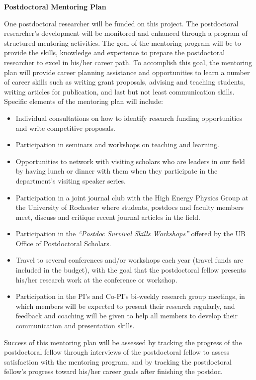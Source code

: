 \documentclass[11pt]{article}
\begin{document}

\noindent
{\Large \bf Postdoctoral Mentoring Plan}
\bigskip

One postdoctoral researcher will be funded on this project. The
postdoctoral researcher's development will be monitored and enhanced through a program of structured
mentoring activities. The  goal of the mentoring program will be to
provide the skills, knowledge and experience to prepare the postdoctoral
researcher to excel in his/her career path. To accomplish this goal, the
mentoring plan will provide career planning assistance and opportunities
to learn a number of career skills such as writing grant proposals,
advising and teaching students, writing articles for publication, and last but not least 
communication skills. Specific elements of the mentoring plan will include:

\begin{itemize}

\item Individual consultations on how to identify research funding
  opportunities and write competitive proposals.

\item Participation in seminars and workshops on teaching and learning.

\item Opportunities to network with visiting scholars who are leaders in
  our field by having lunch or dinner with them when they participate in
  the department's visiting speaker series.

\item Participation in a joint journal club with the High Energy Physics
  Group at the University of Rochester where students, postdocs and
  faculty members meet, discuss and critique recent journal articles in
  the field.

\item Participation in the {\sl ``Postdoc Survival Skills Workshops''} offered by the UB
 Office of Postdoctoral Scholars. 

\item Travel to several conferences and/or workshops each year (travel
  funds are included in the budget), with the goal that the postdoctoral
  fellow presents his/her research work at the conference or workshop.

\item Participation in the PI's and Co-PI's bi-weekly research group
  meetings, in which members will be expected to present their research
  regularly, and feedback and coaching will be given to help all members
  to develop their communication and presentation skills.

\end{itemize}

Success of this mentoring plan will be assessed by tracking the progress
of the postdoctoral fellow through interviews of the postdoctoral fellow
to assess satisfaction with the mentoring program, and by tracking 
the postdoctoral fellow's progress toward his/her career goals after
finishing the postdoc.
\end{document}
